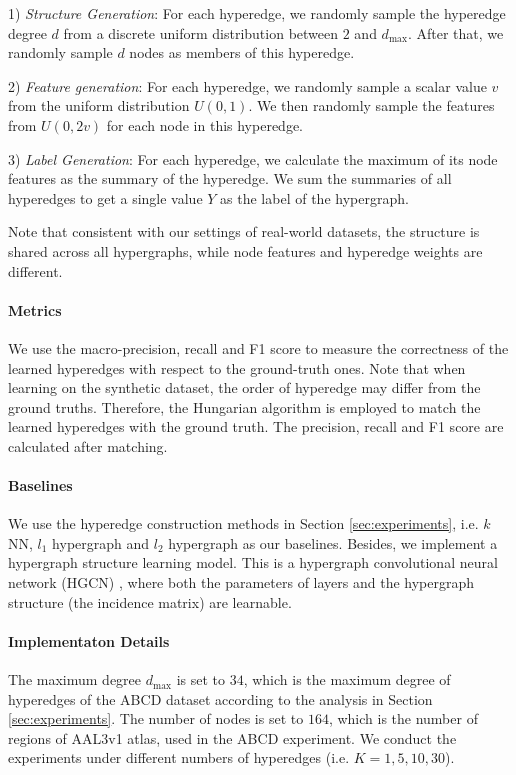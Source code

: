 1) \textit{Structure Generation}: For each hyperedge, we randomly sample the hyperedge degree $d$ from a discrete uniform distribution between $2$ and $d_{\text{max}}$. After that, we randomly sample $d$ nodes as members of this hyperedge. 

2) \textit{Feature generation}: For each hyperedge, we randomly sample a scalar value $v$ from the uniform distribution $U(0,1)$. We then randomly sample the features from $U(0, 2v)$ for each node in this hyperedge.

3) \textit{Label Generation}: For each hyperedge, we calculate the maximum of its node features as the summary of the hyperedge. We sum the summaries of all hyperedges to get a single value $Y$ as the label of the hypergraph. 

Note that consistent with our settings of real-world datasets, the structure is shared across all hypergraphs, while node features and hyperedge weights are different.

\paragraph{Metrics} We use the macro-precision, recall and F1 score to measure the correctness of the learned hyperedges with respect to the ground-truth ones. Note that when learning on the synthetic dataset, the order of hyperedge may differ from the ground truths. Therefore, the Hungarian algorithm is employed to match the learned hyperedges with the ground truth. The precision, recall and F1 score are calculated after matching.

\paragraph{Baselines}
We use the hyperedge construction methods in Section \ref{sec:experiments}, i.e. $k$NN\cite{huang2009video}, $l_1$ hypergraph\cite{wang2015visual} and $l_2$ hypergraph\cite{jin2019robust} as our baselines. 
Besides, we implement a hypergraph structure learning model. This is a hypergraph convolutional neural network (HGCN) \citep{bai2021hypergraph}, where both the parameters of layers and the hypergraph structure (the incidence matrix) are learnable.

\paragraph{Implementaton Details}
The maximum degree $d_{\text{max}}$ is set to $34$, which is the maximum degree of hyperedges of the ABCD dataset according to the analysis in Section \ref{sec:experiments}. The number of nodes is set to $164$, which is the number of regions of AAL3v1 atlas, used in the ABCD experiment. We conduct the experiments under different numbers of hyperedges (i.e. $K = 1,5,10,30$).

